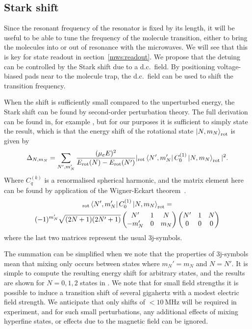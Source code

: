 \subsection{Stark shift}

Since the resonant frequency of the resonator is fixed by its length, it will
be useful to be able to tune the frequency of the molecule transition, either
to bring the molecules into or out of resonance with the microwaves. We will
see that this is key for state readout in section~\ref{mws:readout}. We propose
that the detuing can be controlled by the Stark shift due to a d.c.~field.  By
positioning voltage-biased pads near to the molecule trap, the d.c.~field can
be used to shift the transition frequency.

When the shift is sufficiently small compared to the unperturbed energy, the
Stark shift can be found by second-order perturbation theory. The full
derivation can be found in, for example , but
for our purposes it is sufficient to simply state the result, which is that the
energy shift of the rotational state $\ket{N, m_N}_\text{rot}$
is given by 
%
\begin{equation}
  \Delta_{N, m_N} = \sum_{N', m_N'} \frac{(\mu_e E)^2}{E_\text{rot}(N) -
  E_\text{rot}(N')} |_\text{rot}\bra{N', m_N'}C_0^{(1)} \ket{N,
m_N}_\text{rot}|^2.
\end{equation}
%
Where $C_q^{(k)}$ is a renormalised spherical harmonic, and the matrix element
here can be found by application of the Wigner-Eckart
theorem~\cite{edmonds1996}.
%
\begin{multline} _\text{rot}\bra{N', m_N'}C_0^{(1)} \ket{N, m_N}_\text{rot} =
  \\ (-1)^{m_N'}\sqrt{(2N+1)(2N'+1)}
  \begin{pmatrix} N' & 1 & N \\ -m_N' & 0 & m_N \end{pmatrix} \begin{pmatrix}
N' & 1 & N \\ 0 & 0 & 0 \end{pmatrix}
\end{multline}
%
where the last two matrices represent the usual 3j-symbols.


The summation can be simplified when we note that the properties of 3j-symbols
mean that mixing only occurs between states where $m_N' = m_N$ and $N=N'$. It
is simple to compute the resulting energy shift for arbitrary states, and the
results are shown for $N=0, 1, 2$ \CaF{} states in . We
note that for small field strengths it is possible to induce a transition shift
of several gigahertz with a modest electric field strength. We anticipate that
only shifts of $<\SI{10}{\mega\hertz}$ will be required in
experiment, and for such small perturbations, any additional effects of mixing
hyperfine states, or effects due to the magnetic field can be ignored.

